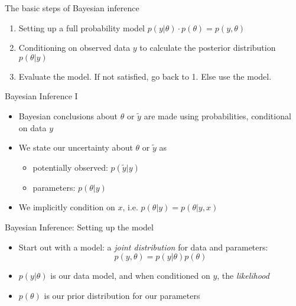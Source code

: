 \documentclass[10pt]{beamer}
\begin{document}
\begin{frame}{The basic steps of Bayesian inference}

  \begin{enumerate}
  \item Setting up a full probability model $p(y|\theta) \cdot p(\theta) = p(y,\theta)$ %
  \pause
  \item Conditioning on observed data $y$ to calculate the posterior distribution $p(\theta|y)$%
  \pause
  \item Evaluate the model. If not satisfied, go back to 1. Else use the model.%
   \end{enumerate}
\end{frame}


\begin{frame}{Bayesian Inference I}
  \begin{itemize}
  \item Bayesian conclusions about $\theta$ or $\tilde{y}$ are made using probabilities, {\color{uured} conditional on data} $y$
  \pause
  \item We state our uncertainty about $\theta$ or $\tilde{y}$ as 
  \pause
  \begin{itemize}
    \item potentially observed: $p(\tilde{y}|y)$
    \item parameters: $p(\theta|y)$
  \end{itemize}
  \item We implicitly condition on $x$, i.e. $p(\theta|y) = p(\theta|y, x)$
  \end{itemize}
\end{frame}


\begin{frame}{Bayesian Inference: Setting up the model}
  \begin{itemize}
  \item Start out with a {\color{uured} model}: a \emph{joint distribution} for data and parameters:
  \[
  p(y,\theta) = p(y|\theta) p(\theta)
  \]
  \pause
  \item $p(y|\theta)$ is our data model, and when conditioned on $y$, the \emph{likelihood}
  \pause
  \item $p(\theta)$ is our prior distribution for our parameters
  \end{itemize}
\end{frame}
\end{document}
